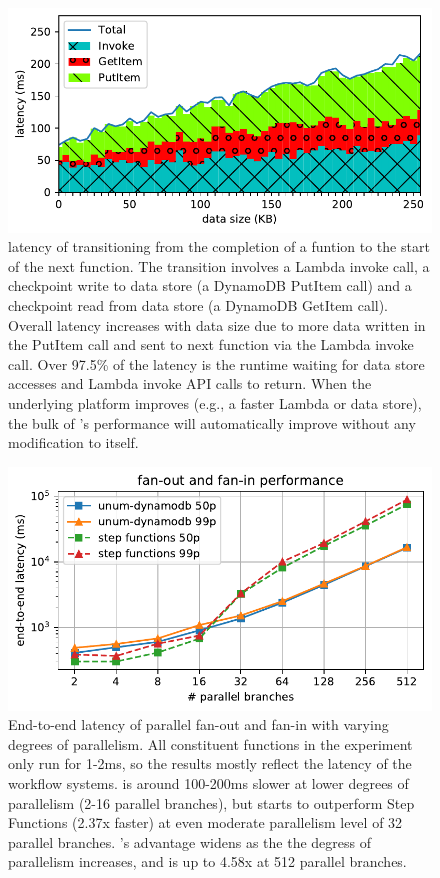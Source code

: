 \begin{figure}[t!]
    \centering
    \includegraphics[width=\columnwidth]{figures/TotalAdditionalLatencyNBreakdown.pdf}
    \caption{\name{} latency of transitioning from the completion of a funtion
    to the start of the next function. The transition involves a Lambda
    invoke call, a checkpoint write to data store (a DynamoDB PutItem call)
    and a checkpoint read from data store (a DynamoDB GetItem call). Overall
    latency increases with data size due to more data written in the PutItem
    call and sent to next function via the Lambda invoke call. Over 97.5\% of
    the latency is the
    \name{} runtime waiting for data store accesses and Lambda invoke API
    calls to return. When the underlying platform improves (e.g., a faster
    Lambda or data store), the bulk of \name{}'s performance will
    automatically improve without any modification to \name{} itself.}
    \label{fig:single-transition-latency-breakdown}
\end{figure}

\begin{figure}[t!]
    \centering
    \includegraphics[width=\columnwidth]{figures/MapMicroLatency.pdf}
    \caption{End-to-end latency of parallel fan-out and fan-in with varying
    degrees of parallelism. All constituent functions in the experiment only
    run for 1-2ms, so the results mostly reflect the latency of the workflow
    systems. \name{} is around 100-200ms slower at lower degrees of
    parallelism (2-16 parallel branches), but starts to outperform Step
    Functions (2.37x faster) at even moderate parallelism level of 32 parallel
    branches. \name{}'s advantage widens as the the degress of parallelism
    increases, and is up to 4.58x at 512 parallel branches.}
    \label{fig:mapmicrolatency}
\end{figure}

